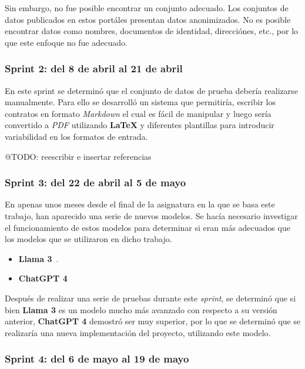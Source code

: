 Sin embargo, no fue posible encontrar un conjunto adecuado.
Los conjuntos de datos publicados en estos portáles presentan datos anonimizados.
No es posible encontrar datos como nombres, documentos de identidad, direcciónes, etc., por lo que este enfoque no fue
adecuado.

\subsubsection{Sprint 2: del 8 de abril al 21 de abril}

En este sprint se determinó que el conjunto de datos de prueba debería realizarse manualmente.
Para ello se desarrolló un sistema que permitiría, escribir los contratos en formato \textit{Markdown} el cual es fácil
de manipular y luego sería convertido a \textit{PDF} utilizando \textbf{LaTeX} y diferentes plantillas para introducir
variabilidad en los formatos de entrada.

\colorbox{color_highlight}{@TODO: reescribir e insertar referencias}

\subsubsection{Sprint 3: del 22 de abril al 5 de mayo}

En apenas unos meses desde el final de la asignatura en la que se basa este trabajo, han aparecido una serie de nuevos
modelos.
Se hacía necesario investigar el funcionamiento de estos modelos para determinar si eran más adecuados que los modelos
que se utilizaron en dicho trabajo.

\begin{itemize}
    \item \textbf{Llama 3}~\cite{https://ollama.com/library/llama3}.
    \item \textbf{ChatGPT 4}~\cite{https://platform.openai.com/docs/models/gpt-4}
\end{itemize}

Después de realizar una serie de pruebas durante este \textit{sprint}, se determinó que si bien \textbf{Llama 3} es un
modelo mucho más avanzado con respecto a su versión anterior, \textbf{ChatGPT 4} demostró ser muy superior, por lo que
se determinó que se realizaría una nueva implementación del proyecto, utilizando este modelo.

\subsubsection{Sprint 4: del 6 de mayo al 19 de mayo}


